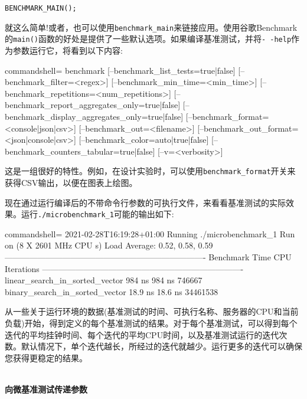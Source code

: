 \begin{lstlisting}[style=styleCXX]
BENCHMARK_MAIN();
\end{lstlisting}

就这么简单!或者，也可以使用\texttt{benchmark\_main}来链接应用。使用谷歌Benchmark的\texttt{main()}函数的好处是提供了一些默认选项。如果编译基准测试，并将\texttt{-\,-help}作为参数运行它，将看到以下内容:

\begin{tcblisting}{commandshell={}}
benchmark [--benchmark_list_tests={true|false}]
          [--benchmark_filter=<regex>]
          [--benchmark_min_time=<min_time>]
          [--benchmark_repetitions=<num_repetitions>]
          [--benchmark_report_aggregates_only={true|false}]
          [--benchmark_display_aggregates_only={true|false}]
          [--benchmark_format=<console|json|csv>]
          [--benchmark_out=<filename>]
          [--benchmark_out_format=<json|console|csv>]
          [--benchmark_color={auto|true|false}]
          [--benchmark_counters_tabular={true|false}]
          [--v=<verbosity>]
\end{tcblisting}

这是一组很好的特性。例如，在设计实验时，可以使用\texttt{benchmark\_format}开关来获得CSV输出，以便在图表上绘图。

现在通过运行编译后的不带命令行参数的可执行文件，来看看基准测试的实际效果。运行\texttt{./microbenchmark\_1}可能的输出如下:

\begin{tcblisting}{commandshell={}}
2021-02-28T16:19:28+01:00
Running ./microbenchmark_1
Run on (8 X 2601 MHz CPU s)
Load Average: 0.52, 0.58, 0.59
-------------------------------------------------------------------------
Benchmark Time CPU Iterations
-------------------------------------------------------------------------
linear_search_in_sorted_vector 984 ns 984 ns 746667
binary_search_in_sorted_vector 18.9 ns 18.6 ns 34461538
\end{tcblisting}

从一些关于运行环境的数据(基准测试的时间、可执行名称、服务器的CPU和当前负载)开始，得到定义的每个基准测试的结果。对于每个基准测试，可以得到每个迭代的平均挂钟时间、每个迭代的平均CPU时间，以及基准测试运行的迭代次数。默认情况下，单个迭代越长，所经过的迭代就越少。运行更多的迭代可以确保您获得更稳定的结果。

\hspace*{\fill} \\ %
\noindent
\textbf{向微基准测试传递参数}

